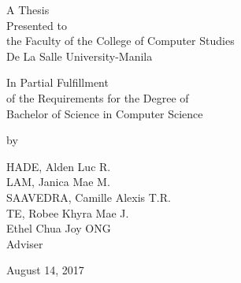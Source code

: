%
%
%                 

\begin{titlepage}
\centering



\vspace{1.75cm}
A Thesis\\
Presented to\\
the Faculty of the College of Computer Studies\\
De La Salle University-Manila

\vspace{1.75cm}
In Partial Fulfillment\\
of the Requirements for the Degree of\\
Bachelor of  Science in Computer Science

\vspace{1.75cm}
by\\
\vspace{1cm}

HADE, Alden Luc R. \\
LAM, Janica Mae M.  \\
SAAVEDRA, Camille Alexis T.R.  \\
TE, Robee Khyra Mae J. \\

\vspace{1.75cm}
Ethel Chua Joy ONG \\
Adviser

\vspace{1.75cm}
August 14, 2017 \\ %
\end{titlepage}
